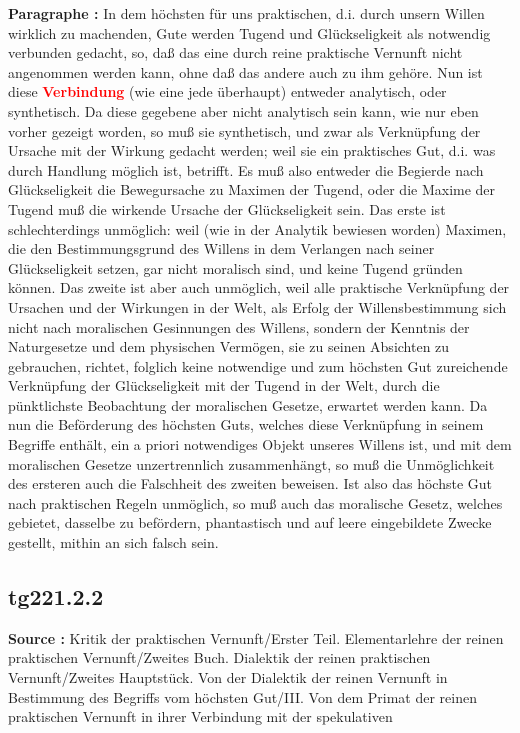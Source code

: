 \documentclass[a4paper,12pt,twoside]{book}
\newcommand{\match}[1]{\textcolor{red}{\textbf{#1}}}
\begin{document}
	\textbf{Paragraphe : }In dem höchsten für uns praktischen, d.i. durch unsern Willen wirklich zu machenden, Gute werden Tugend und Glückseligkeit als notwendig verbunden gedacht, so, daß das eine durch reine praktische Vernunft nicht angenommen werden kann, ohne daß das andere auch zu ihm gehöre. Nun ist diese \match{Verbindung} (wie eine jede überhaupt) entweder analytisch, oder synthetisch. Da diese gegebene aber nicht analytisch sein kann, wie nur eben vorher gezeigt worden, so muß sie synthetisch, und zwar als Verknüpfung der Ursache mit der Wirkung gedacht werden; weil sie ein praktisches Gut, d.i. was durch Handlung möglich ist, betrifft. Es muß also entweder die Begierde nach Glückseligkeit die Bewegursache zu Maximen der Tugend, oder die Maxime der Tugend muß die wirkende Ursache der Glückseligkeit sein. Das erste ist schlechterdings unmöglich: weil (wie in der Analytik bewiesen worden) Maximen, die den Bestimmungsgrund des Willens in dem Verlangen nach seiner Glückseligkeit setzen, gar nicht moralisch sind, und keine Tugend gründen können. Das zweite ist aber auch unmöglich, weil alle praktische Verknüpfung der Ursachen und der Wirkungen in der Welt, als Erfolg der Willensbestimmung sich nicht nach moralischen Gesinnungen des Willens, sondern der Kenntnis der Naturgesetze und dem physischen Vermögen, sie zu seinen Absichten zu gebrauchen, richtet, folglich keine notwendige und zum höchsten Gut zureichende Verknüpfung der Glückseligkeit mit der Tugend in der Welt, durch die pünktlichste Beobachtung der moralischen Gesetze, erwartet werden kann. Da nun die Beförderung des höchsten Guts, welches diese Verknüpfung in seinem Begriffe enthält, ein a priori notwendiges Objekt unseres Willens ist, und mit dem moralischen Gesetze unzertrennlich zusammenhängt, so muß die Unmöglichkeit des ersteren auch die Falschheit des zweiten beweisen. Ist also das höchste Gut nach praktischen Regeln unmöglich, so muß auch das moralische Gesetz, welches gebietet, dasselbe  zu befördern, phantastisch und auf leere eingebildete Zwecke gestellt, mithin an sich falsch sein. 
	
	\subsection*{tg221.2.2} 
	\textbf{Source : }Kritik der praktischen Vernunft/Erster Teil. Elementarlehre der reinen praktischen Vernunft/Zweites Buch. Dialektik der reinen praktischen Vernunft/Zweites Hauptstück. Von der Dialektik der reinen Vernunft in Bestimmung des Begriffs vom höchsten Gut/III. Von dem Primat der reinen praktischen Vernunft in ihrer Verbindung mit der spekulativen\\  
	
\end{document}
